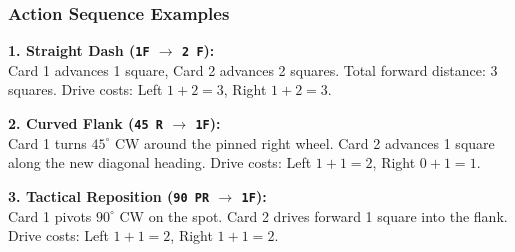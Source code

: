 \documentclass[11pt,a4paper]{article}
\begin{document}
\subsubsection{Action Sequence Examples}

\noindent\textbf{1. Straight Dash (\texttt{1F} $\rightarrow$ \texttt{2 F}):}\\
Card 1 advances 1 square, Card 2 advances 2 squares. Total forward distance: 3 squares. Drive costs: Left $1+2 = 3$, Right $1+2 = 3$.

\vspace{0.3em}
\noindent\textbf{2. Curved Flank (\texttt{45 R} $\rightarrow$ \texttt{1F}):}\\
Card 1 turns $45^\circ$ CW around the pinned right wheel. Card 2 advances 1 square along the new diagonal heading. Drive costs: Left $1+1 = 2$, Right $0+1 = 1$.

\vspace{0.3em}
\noindent\textbf{3. Tactical Reposition (\texttt{90 PR} $\rightarrow$ \texttt{1F}):}\\
Card 1 pivots $90^\circ$ CW on the spot. Card 2 drives forward 1 square into the flank. Drive costs: Left $1+1 = 2$, Right $1+1 = 2$.
\end{document}
